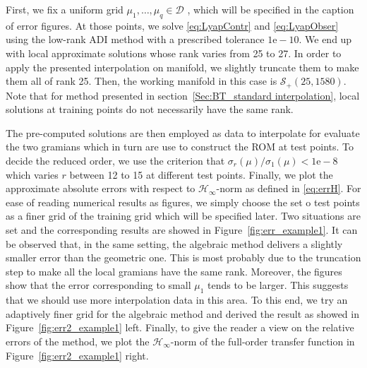 First, we fix a uniform grid $\mu_1,\dots, \mu_q \in \mathcal{D}$ , which will be specified in the caption of error figures. At those points, we solve \eqref{eq:LyapContr} and \eqref{eq:LyapObser} using the low-rank ADI method \cite{LiW02} with a prescribed tolerance $1\mbox{e}-10$. We end up with local approximate solutions whose rank varies from 25 to 27. In order to apply the presented interpolation on manifold, we slightly truncate them to make them all of rank 25. Then, the working manifold in this case is $\mathcal{S}_+(25,1580)$. Note that for method presented in section~\ref{Sec:BT_standard interpolation}, local solutions at training points do not necessarily have the same rank.

The pre-computed solutions are then employed as data to interpolate for evaluate the two gramians which in turn are use to construct the ROM at test points. To decide the reduced order, we use the criterion that $\sigma_r(\mu)/\sigma_1(\mu) < 1\mbox{e}-8$ which varies $r$ between 12 to 15 at different test points. Finally, we plot the approximate absolute errors with respect to $\mathcal{H}_\infty$-norm as defined in \eqref{eq:errH}. For ease of reading numerical results as figures, we simply choose the set o test points as a finer grid of the training grid which will be specified later. Two situations are set and the corresponding results are showed in Figure~\ref{fig:err_example1}. It can be observed that, in the same setting, the algebraic method delivers a slightly smaller error than the geometric one. This is most probably due to the truncation step to make all the local gramians have the same rank. %
 Moreover, the figures show that the error corresponding to small $\mu_1$ tends to be larger. This suggests that we should use more interpolation data in this area. To this end, we try an adaptively finer grid for the algebraic method and derived the result as showed in Figure~\ref{fig:err2_example1} left. Finally, to give the reader a view on the relative errors of the method, we plot the $\mathcal{H}_\infty$-norm of the full-order transfer function in Figure~\ref{fig:err2_example1} right.

